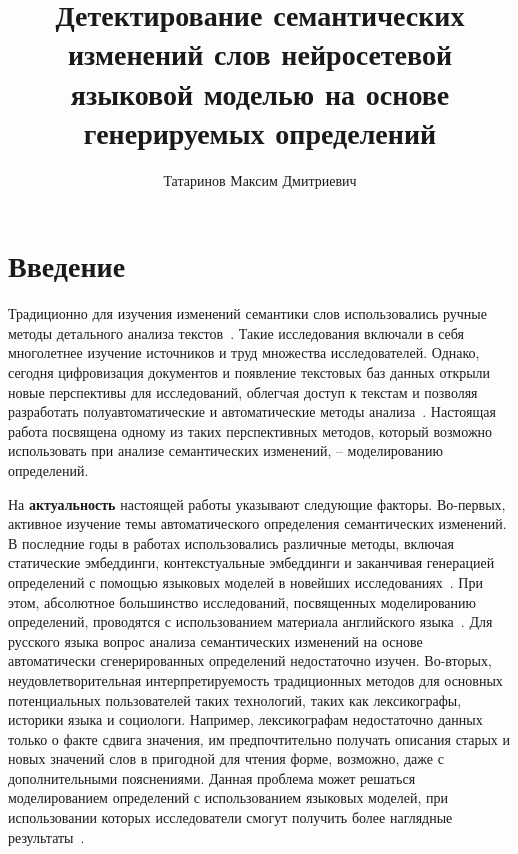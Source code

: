 \documentclass[LI,VKR]{HSEUniversity}
\title{Детектирование семантических изменений слов нейросетевой
языковой моделью на основе генерируемых определений}
\author{Татаринов Максим Дмитриевич}
\begin{document}
\maketitle

\chapter*{Введение}

Традиционно для изучения изменений семантики слов использовались ручные методы детального
анализа текстов~\cite{VinogradovWordHistory, TwoCenturies}.
Такие исследования включали в себя многолетнее изучение источников и труд множества исследователей.
Однако, сегодня цифровизация документов и появление текстовых
баз данных открыли новые перспективы для исследований,
облегчая доступ к текстам и позволяя разработать полуавтоматические и
автоматические методы анализа~\cite{TahmasebiComputationalApproachesToSemanticChange}.
Настоящая работа посвящена одному из таких перспективных методов,
который возможно использовать при анализе семантических изменений,
– моделированию определений.

На \textbf{актуальность} настоящей работы указывают следующие факторы.
Во-первых, активное изучение темы автоматического определения семантических изменений.
В последние годы в работах использовались различные методы, включая статические эмбеддинги,
контекстуальные эмбеддинги и заканчивая генерацией определений с помощью языковых моделей
в новейших исследованиях~\cite{kutuzov-etal-2018-diachronic,rodina2020elmo,DefinitionGenerationMainArticle}.
При этом, абсолютное большинство исследований, посвященных моделированию определений,
проводятся с использованием материала английского языка~\cite{DefinitionModelingReviewAndDatasetAnalysis}.
Для русского языка вопрос анализа семантических изменений на основе автоматически
сгенерированных определений недостаточно изучен.
Во-вторых, неудовлетворительная интерпретируемость традиционных методов для основных потенциальных
пользователей таких технологий, таких как лексикографы, историки языка и социологи.
Например, лексикографам недостаточно данных только о факте сдвига значения, им предпочтительно
получать описания старых и новых значений слов в пригодной для чтения форме, возможно,
даже с дополнительными пояснениями.
Данная проблема может решаться моделированием определений с использованием языковых
моделей, при использовании которых исследователи смогут получить более наглядные
результаты~\cite{DefinitionGenerationMainArticle}.
\end{document}
